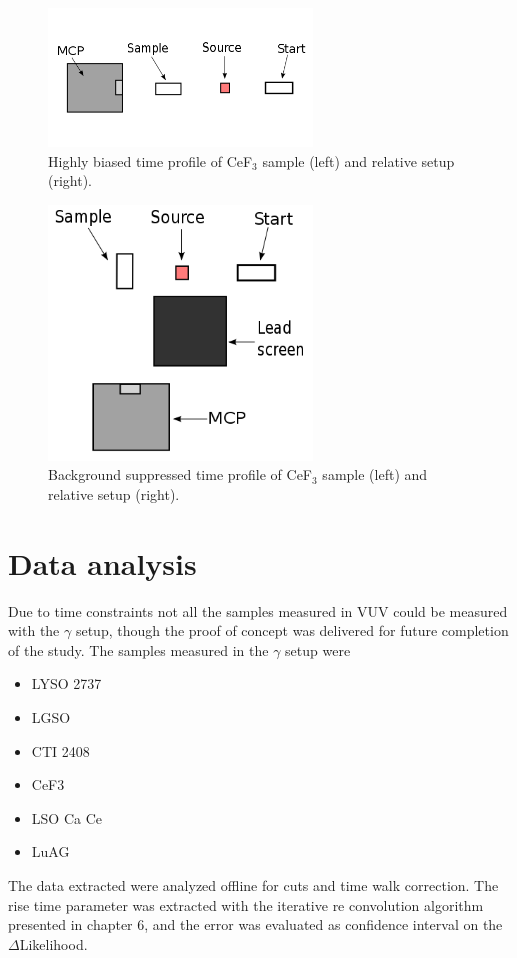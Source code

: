 \begin{figure}
\begin{center}
\includegraphics[width=7cm]{../Pictures/Chapter_8/setup_direct.png}
\end{center}
\caption[Background biased measurement]{Highly biased time profile of CeF$_{3}$ sample (left) and relative setup (right).}
\label{fig:twist2}
\end{figure}

\begin{figure}
\begin{center}
\includegraphics[width=7cm]{../Pictures/Chapter_8/setup_twist.png}
\end{center}
\caption[Background suppressed measurement]{Background suppressed time profile of CeF$_{3}$ sample (left) and relative setup (right).}
\label{fig:twist3}
\end{figure}

\section{Data analysis}
Due to time constraints not all the samples measured in VUV could be measured with the $\gamma$ setup, though the proof of concept was delivered for future completion of the study.
The samples measured in the $\gamma$ setup were
\begin{itemize}
\item LYSO 2737
\item LGSO
\item CTI 2408
\item CeF3
\item LSO Ca Ce
\item LuAG %
\end{itemize}
The data extracted were analyzed offline for cuts and time walk correction. 
The rise time parameter was extracted with the iterative re convolution algorithm presented in chapter 6, and the error was evaluated as confidence interval on the $\Delta$Likelihood.

